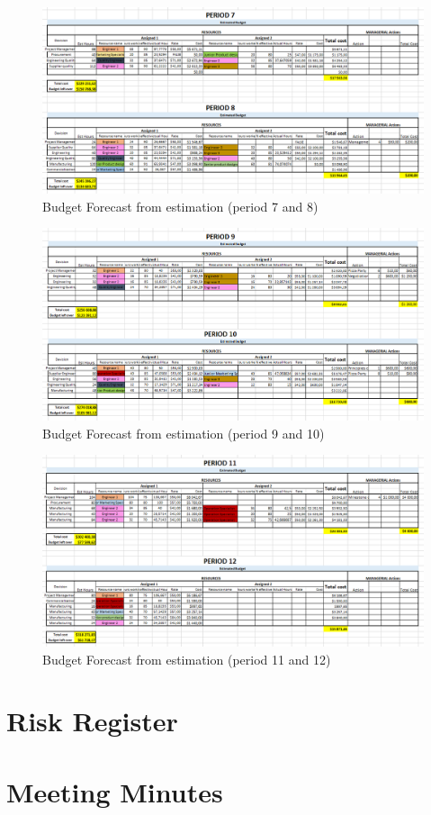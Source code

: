\begin{appendices}
\begin{landscape}
\begin{figure}[H]
\includegraphics[scale=0.8]{budget_forecast_est_78.PNG}
\caption{Budget Forecast from estimation (period 7 and 8)}
\end{figure}
\begin{figure}[H]
\includegraphics[scale=0.8]{budget_forecast_est_910.PNG}
\caption{Budget Forecast from estimation (period 9 and 10)}
\end{figure}
\begin{figure}[H]
\includegraphics[scale=0.8]{budget_forecast_est_1112.PNG}
\caption{Budget Forecast from estimation (period 11 and 12)}
\end{figure}

\end{landscape}

\section{Risk Register}
\section{Meeting Minutes}

\end{appendices}



